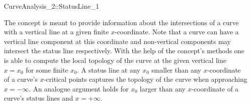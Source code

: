 \begin{ccRefConcept}{CurveAnalysis_2::StatusLine_1}

\ccDefinition

The  concept is meant to provide information
about the intersections of a curve with a vertical line at a given 
finite $x$-coordinate. Note that a curve can have a vertical line component 
at this coordinate and non-vertical components may intersect 
the status line respectively. 
With the help of the concept's methods one is able
to compute the local topology of the curve 
at the given vertical line $x = x_0$ for some finite $x_0$.
A status line at any $x_0$ smaller than any $x$-coordinate of a curve's 
$x$-critical points captures the topology of the curve when 
approaching $x = -\infty$.
An analogue argument holds for $x_0$ larger than any $x$-coordinate
of a curve's status lines and $x = +\infty$.


\ccTypes




\ccAccessFunctions





\end{ccRefConcept}
